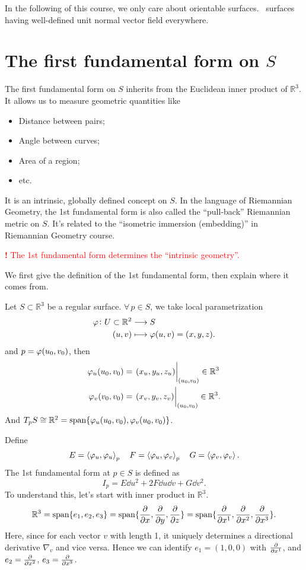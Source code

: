 \begin{remark}
    In the following of this course, we only care about orientable surfaces.
    \ie\ surfaces having well-defined unit normal vector field everywhere.
\end{remark}

\section{The first fundamental form on \texorpdfstring{\(S\)}{S}}

The first fundamental form on \(S\) inherits from the Euclidean inner product of
\(\mathbb{R}^3\). It allows us to measure geometric quantities like
\begin{itemize}
    \item Distance between pairs;
    \item Angle between curves;
    \item Area of a region;
    \item etc.
\end{itemize}
It is an intrinsic, globally defined concept on \(S\). In the language of Riemannian
Geometry, the 1st fundamental form is also called the ``pull-back'' Riemannian
metric on \(S\). It's related to the ``isometric immersion (embedding)'' in 
Riemannian Geometry course.

\begin{center}
\textcolor{red}{
    \textbf{\large!} The 1st fundamental form determines the ``intrinsic
    geometry''.
}
\end{center}

We first give the definition of the 1st fundamental form, then explain where it
comes from.

Let \(S\subset \mathbb{R}^3\) be a regular surface. \(\forall\,p\in S\), we take
local parametrization
\begin{align*}
    \varphi\colon U\subset \mathbb{R}^2 &\longrightarrow S \\
    (u,v)&\longmapsto \varphi(u,v)=(x,y,z)
.\end{align*}
and \(p=\varphi(u_0,v_0)\), then 
\begin{align*}
    \vphi_u(u_0,v_0)&=\eval{(x_u,y_u,z_u)}_{(u_0,v_0)}\in \mathbb{R}^3 \\
    \vphi_v(v_0,v_0)&=\eval{(x_v,y_v,z_v)}_{(u_0,v_0)}\in \mathbb{R}^3
.\end{align*}
And \(T_p S\cong \mathbb{R}^2=\operatorname{span}\{\varphi_u(u_0,v_0),\varphi_v(u_0,v_0)\}\).

Define \[
    E=\left<\varphi_u,\varphi_u\right>_p\quad F=\left<\varphi_u,\varphi_v\right>_p\quad
    G=\left<\varphi_v,\varphi_v\right>.
\] The 1st fundamental form at \(p\in S\) is defined as \[
    I_p=E\dd{u}^2+2F\dd{u}\dd{v}+G\dd{v}^2
.\] To understand this, let's start with inner product in \(\mathbb{R}^3\). \[
    \mathbb{R}^3=\operatorname{span}\{e_1,e_2,e_3\}=\operatorname{span}\{\pdv{x},\pdv{y},\pdv{z}\}
    =\operatorname{span}\{\pdv{x^1},\pdv{x^2},\pdv{x^3}\}.
\] Here, since for each vector \(v\) with length 1, it uniquely determines a
directional derivative \(\nabla_v\) and vice versa.
Hence we can identify \(e_1=(1,0,0)\) with \(\pdv{x^1}\), and \(e_2=\pdv{x^2}\),
\(e_3=\pdv{x^3}\).

